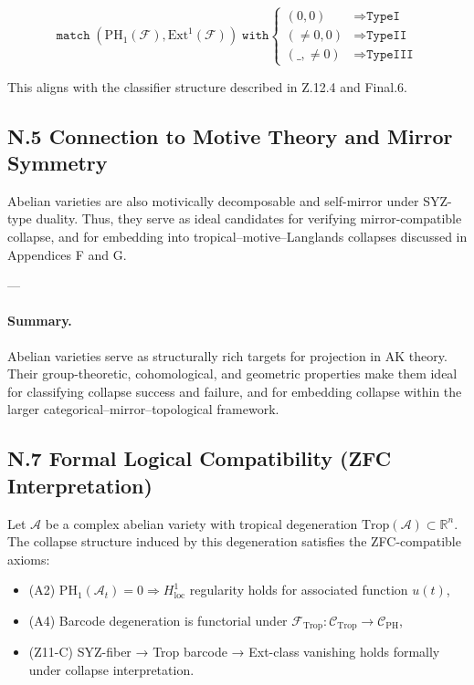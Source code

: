 \documentclass[11pt]{article}
\begin{document}
\begin{axiom}
\begin{axiom}
{{\[
\texttt{match} \; (\mathrm{PH}_1(\mathcal{F}), \mathrm{Ext}^1(\mathcal{F})) \; \texttt{with}
\begin{cases}
(0, 0) &\Rightarrow \texttt{TypeI} \\
(\neq 0, 0) &\Rightarrow \texttt{TypeII} \\
(\_, \neq 0) &\Rightarrow \texttt{TypeIII}
\end{cases}
\]

This aligns with the classifier structure described in Z.12.4 and Final.6.


\subsection*{N.5 Connection to Motive Theory and Mirror Symmetry}

Abelian varieties are also motivically decomposable and self-mirror under SYZ-type duality.  
Thus, they serve as ideal candidates for verifying mirror-compatible collapse, and for embedding into tropical–motive–Langlands collapses discussed in Appendices F and G.

---

\paragraph{Summary.}

Abelian varieties serve as structurally rich targets for projection in AK theory.  
Their group-theoretic, cohomological, and geometric properties make them ideal for classifying collapse success and failure, and for embedding collapse within the larger categorical–mirror–topological framework.


\subsection*{N.7 Formal Logical Compatibility (ZFC Interpretation)}

Let \( \mathcal{A} \) be a complex abelian variety with tropical degeneration \( \mathrm{Trop}(\mathcal{A}) \subset \mathbb{R}^n \).  
The collapse structure induced by this degeneration satisfies the ZFC-compatible axioms:

\begin{itemize}
  \item (A2) \( \mathrm{PH}_1(\mathcal{A}_t) = 0 \Rightarrow H^1_{\text{loc}} \) regularity holds for associated function \( u(t) \),
  \item (A4) Barcode degeneration is functorial under \( \mathcal{F}_{\mathrm{Trop}}: \mathcal{C}_{\text{Trop}} \to \mathcal{C}_{\mathrm{PH}} \),
  \item (Z11-C) SYZ-fiber → Trop barcode → Ext-class vanishing holds formally under collapse interpretation.
\end{itemize}

}}
\end{axiom}
\end{axiom}
\end{document}
